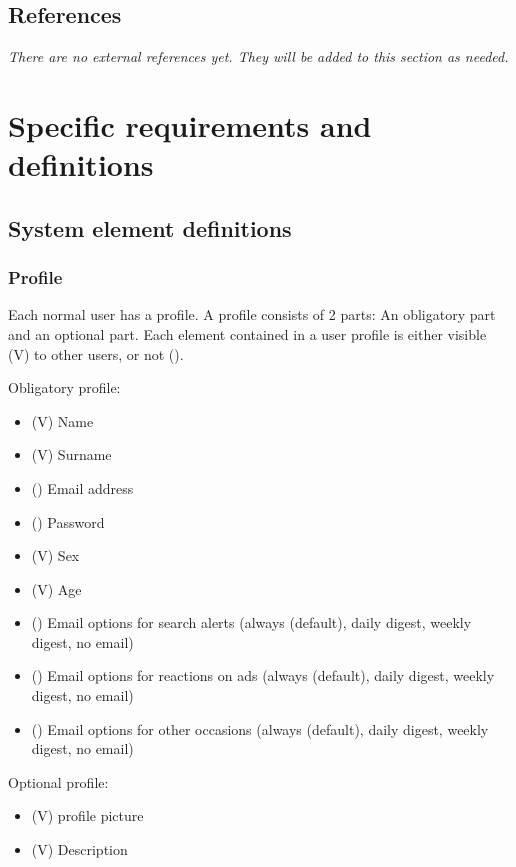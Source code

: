 \documentclass[a4wide]{article}
\begin{document}
\subsection{References}
\textit{There are no external references yet. They will be added to this section as needed.}
\section{Specific requirements and definitions}
\subsection{System element definitions}
\subsubsection{Profile}
Each normal user has a profile. 
A profile consists of 2 parts: An obligatory part and an optional part.
Each element contained in a user profile is either visible (V) to other users, or not ().

Obligatory profile:
\begin{itemize}
\item (V) Name
\item (V) Surname
\item () Email address
\item () Password
\item (V) Sex
\item (V) Age
\item () Email options for search alerts (always (default), daily digest, weekly digest, no email)
\item () Email options for reactions on ads (always (default), daily digest, weekly digest, no email)
\item () Email options for other occasions (always (default), daily digest, weekly digest,  no email)
\end{itemize}
Optional profile:
\begin{itemize}
\item (V) profile picture
\item (V) Description
\end{itemize}
\end{document}
